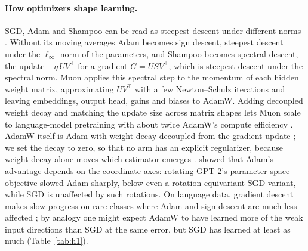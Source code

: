 \documentclass{article}
\begin{document}
\paragraph{How optimizers shape learning.} SGD, Adam and Shampoo \citep{gupta2018shampoo} can be read as steepest descent under different norms \citep{bernstein2024old}. Without its moving averages Adam becomes sign descent, steepest descent under the $\ell_\infty$ norm of the parameters, and Shampoo becomes spectral descent, the update $-\eta\,UV^\top$ for a gradient $G = USV^\top$, which is steepest descent under the spectral norm. Muon \citep{jordan2024muon} applies this spectral step to the momentum of each hidden weight matrix, approximating $UV^\top$ with a few Newton--Schulz iterations and leaving embeddings, output head, gains and biases to AdamW. Adding decoupled weight decay and matching the update size across matrix shapes lets Muon scale to language-model pretraining with about twice AdamW's compute efficiency \citep{liu2025muon}. AdamW itself is Adam with weight decay decoupled from the gradient update \citep{loshchilov2019}; we set the decay to zero, so that no arm has an explicit regularizer, because weight decay alone moves which estimator emerges \citep{raventos2023}. \citet{xie2025adam} showed that Adam's advantage depends on the coordinate axes: rotating GPT-2's parameter-space objective slowed Adam sharply, below even a rotation-equivariant SGD variant, while SGD is unaffected by such rotations. On language data, gradient descent makes slow progress on rare classes where Adam and sign descent are much less affected \citep{kunstner2024heavy}; by analogy one might expect AdamW to have learned more of the weak input directions than SGD at the same error, but SGD has learned at least as much (Table~\ref{tab:h1}).
\end{document}
